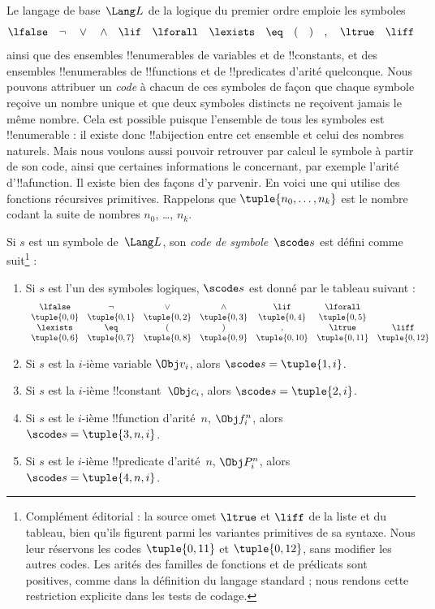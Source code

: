 \documentclass[../../../include/open-logic-section]{subfiles}
\begin{document}

Le langage de base~$\Lang L$ de la logique du premier ordre emploie les
symboles
\[
\lfalse \quad \lnot \quad \lor \quad \land \quad \lif \quad \lforall
\quad \lexists \quad \eq \quad ( \quad ) \quad , \quad \ltrue \quad \liff
\]
ainsi que des ensembles !!{enumerable}s de variables et de
!!{constant}s, et des ensembles !!{enumerable}s de !!{function}s et
de !!{predicate}s d'arité quelconque. Nous pouvons attribuer un
\emph{code} à chacun de ces symboles de façon que chaque symbole
reçoive un nombre unique et que deux symboles distincts ne reçoivent
jamais le même nombre. Cela est possible puisque l'ensemble de tous
les symboles est !!{enumerable} : il existe donc !!a{bijection}
entre cet ensemble et celui des nombres naturels. Mais nous voulons
aussi pouvoir retrouver par calcul le symbole à partir de son code,
ainsi que certaines informations le concernant, par exemple l'arité
d'!!a{function}. Il existe bien des façons d'y parvenir. En voici
une qui utilise des fonctions récursives primitives. Rappelons que
$\tuple{n_0, \dots, n_k}$ est le nombre codant la suite de nombres
$n_0$, \dots, $n_k$.

\begin{defn}
Si $s$ est un symbole de~$\Lang L$, son \emph{code de symbole}~$\scode s$
est défini comme suit\footnote{Complément éditorial : la source omet $\ltrue$ et $\liff$ de la liste et du tableau, bien qu'ils figurent parmi les variantes primitives de sa syntaxe. Nous leur réservons les codes $\tuple{0,11}$ et $\tuple{0,12}$, sans modifier les autres codes. Les arités des familles de fonctions et de prédicats sont positives, comme dans la définition du langage standard ; nous rendons cette restriction explicite dans les tests de codage.} :
\begin{enumerate}
\item Si $s$ est l'un des symboles logiques, $\scode s$ est donné
  par le tableau suivant :
\[
\begin{array}{cccccccccc}
  \lfalse & \lnot & \lor & \land & \lif & \lforall \\
\tuple{0, 0} & \tuple{0, 1} & \tuple{0, 2} & \tuple{0, 3} &
\tuple{0, 4} & \tuple{0, 5} \\
\lexists & \eq & ( & ) & , & \ltrue & \liff\\
\tuple{0, 6} & \tuple{0, 7} &
\tuple{0, 8} & \tuple{0, 9} & \tuple{0, 10} & \tuple{0, 11} & \tuple{0, 12}
\end{array}
\]
\item Si $s$ est la $i$-ième variable $\Obj v_i$, alors
  $\scode s = \tuple{1, i}$.
\item Si $s$ est la $i$-ième !!{constant}~$\Obj c_i$, alors
  $\scode s = \tuple{2, i}$.
\item Si $s$ est le $i$-ième !!{function} d'arité~$n$, $\Obj f_i^n$,
  alors $\scode s = \tuple{3, n, i}$.
\item Si $s$ est le $i$-ième !!{predicate} d'arité~$n$, $\Obj P_i^n$,
  alors $\scode s = \tuple{4, n, i}$.
\end{enumerate}
\end{defn}
\end{document}

